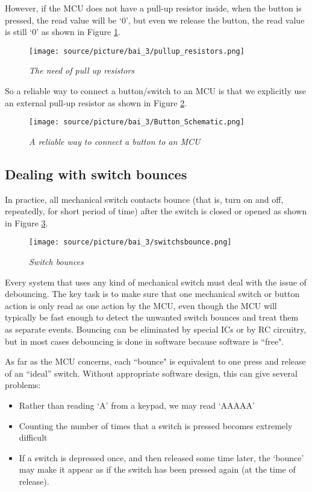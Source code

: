  However, if the MCU does not have a pull-up resistor inside, when the button is pressed, the read value will be `0', but even we release the button, the read value is still `0' as shown in Figure \ref{bai4_pic_the_need_of_pull_up_resistors}.
 \begin{figure}[!htp]
    \centering
    \texttt{[image: source/picture/bai\_3/pullup\_resistors.png]}
    \caption{\textit{The need of pull up resistors}}
    \label{bai4_pic_the_need_of_pull_up_resistors}
\end{figure}

So a reliable way to connect a button/switch to an MCU is that we explicitly use an external pull-up resistor as shown in Figure \ref{bai4_pic_button_schematic_1}.

 \begin{figure}[!htp]
    \centering
    \texttt{[image: source/picture/bai\_3/Button\_Schematic.png]}
    \caption{\textit{A reliable way to connect a button to an MCU}}
    \label{bai4_pic_button_schematic_1}
\end{figure}
 
\subsection{Dealing with switch bounces}
In practice, all mechanical switch contacts bounce (that is, turn on and off, repeatedly, for short period of time) after the switch is closed or opened as shown in Figure \ref{bai4_pic_switchsbounce}.
\begin{figure}[!htp]
    \centering
    \texttt{[image: source/picture/bai\_3/switchsbounce.png]}
    \caption{\textit{Switch bounces}}
    \label{bai4_pic_switchsbounce}
\end{figure}

Every system that uses any kind of mechanical switch must deal with the issue of debouncing.  The key task is to make sure that one mechanical switch or button action is only read as one action by the MCU, even though the MCU will typically be fast enough to detect the unwanted switch bounces and treat them as separate events.  Bouncing can be eliminated by special ICs or by RC circuitry, but in most cases debouncing is done in software because software is ``free".

As far as the MCU concerns, each ``bounce" is equivalent to one press and release of an ``ideal” switch. 
Without appropriate software design, this can give several problems:
\begin{itemize}
    \item Rather than reading ‘A’ from a keypad, we may read ‘AAAAA’
    \item Counting the number of times that a switch is pressed becomes extremely difficult
    \item If a switch is depressed once, and then released some time later, the `bounce' may make it appear as if the switch has been pressed again (at the time of release). 
\end{itemize}


